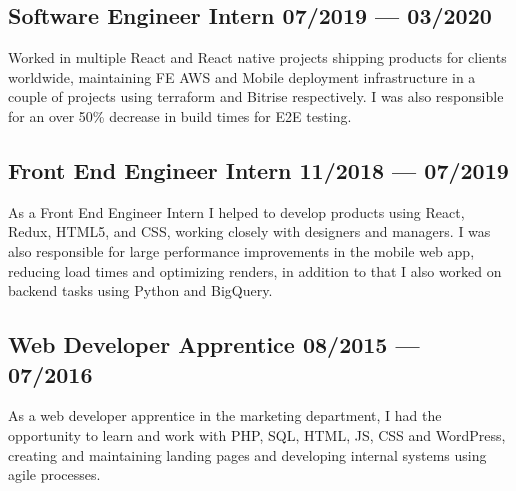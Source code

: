 \documentclass[letter,10pt]{article}
\begin{document}
\subsection{{Software Engineer Intern \hfill 07/2019 --- 03/2020}}
\vspace{3mm}
Worked in multiple React and React native projects shipping products for clients worldwide, maintaining FE AWS and Mobile deployment infrastructure in a couple of projects using terraform and Bitrise respectively. I was also responsible for an over 50\% decrease in build times for E2E testing.
\vspace{1mm}

\subsection{{Front End Engineer Intern \hfill 11/2018 --- 07/2019}}
\vspace{3mm}
As a Front End Engineer Intern I helped to develop products using React, Redux, HTML5, and CSS, working closely with designers and managers. I was also responsible for large performance improvements in the mobile web app, reducing load times and optimizing renders, in addition to that I also worked on backend tasks using Python and BigQuery.

\subsection{{Web Developer Apprentice \hfill 08/2015 --- 07/2016}}
\vspace{3mm}
As a web developer apprentice in the marketing department, I had the opportunity to learn and work with PHP, SQL, HTML, JS, CSS and WordPress, creating and maintaining landing pages and developing internal systems using agile processes.
\end{document}
